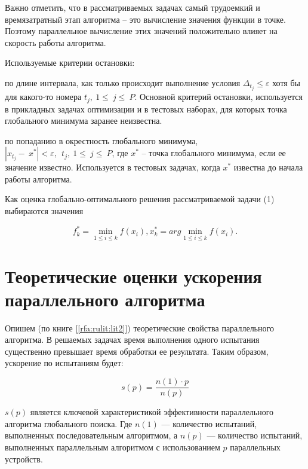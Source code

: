 \documentclass[10pt,a4paper]{book}
\begin{document}
Важно отметить, что в рассматриваемых задачах самый трудоемкий и времязатратный этап алгоритма – это вычисление значения функции в точке. Поэтому параллельное вычисление этих значений положительно влияет на скорость работы алгоритма.

Используемые критерии остановки: 

	по длине интервала, как только происходит выполнение условия \(\Delta_{t_j}\leqslant \varepsilon\) хотя бы для какого-то номера $t_j,\ 1\le\ j\le\ P$. Основной критерий остановки, используется в прикладных задачах оптимизации и в тестовых наборах, для которых точка глобального минимума заранее неизвестна. 
	 
	по попаданию в окрестность глобального минимума, $\left|x_{t_j}-\ x^\ast\right|<\varepsilon,\ \ t_j,\ 1\le\ j\le\ P$, где $x^\ast$ -- точка глобального минимума, если ее значение известно. Используется в тестовых задачах, когда $x^\ast$ известна до начала работы алгоритма.
	
Как оценка глобально-оптимального решения рассматриваемой задачи (1) выбираются значения 


\begin{equation}
f_k^*=\min_{1\leqslant i \leqslant k}f(x_i), x_k^*=arg \min_{1\leqslant i \leqslant k}f(x_i).
\end{equation}


\section{Теоретические оценки ускорения параллельного алгоритма}
Опишем (по книге [\ref{rfa:rulit:lit2}]) теоретические свойства параллельного алгоритма. В решаемых задачах время выполнения одного испытания существенно превышает время обработки ее результата. Таким образом, ускорение по испытаниям будет:

\begin{equation} \label{par_trl_ref}
s(p) = \frac{n(1) \cdot p}{n(p)}
\end{equation}

$s(p)$ является ключевой характеристикой эффективности параллельного алгоритма глобального поиска. Где $n(1)$ — количество испытаний, выполненных последовательным алгоритмом, а $n(p)$ — количество испытаний, выполненных параллельным алгоритмом с использованием $p$ параллельных устройств.
\end{document}
